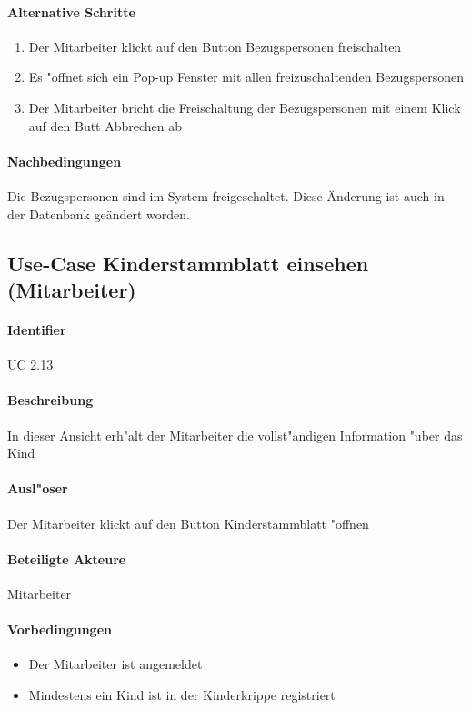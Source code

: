 		\paragraph{Alternative Schritte}
		\begin{enumerate}
			\item Der Mitarbeiter klickt auf den Button \dq Bezugspersonen freischalten\dq
			\item Es "offnet sich ein Pop-up Fenster mit allen freizuschaltenden Bezugspersonen
			\item Der Mitarbeiter bricht die Freischaltung der Bezugspersonen mit einem Klick auf den Butt \dq Abbrechen \dq ab
		\end{enumerate}
			
		\paragraph{Nachbedingungen}
		Die Bezugspersonen sind im System freigeschaltet. Diese Änderung ist auch in der Datenbank geändert worden. 
	  
    
  
  
  \newpage
 \subsection{Use-Case Kinderstammblatt einsehen (Mitarbeiter)}
  \paragraph{Identifier}
  UC 2.13
  \paragraph{Beschreibung}
  In dieser Ansicht erh"alt der Mitarbeiter die vollst"andigen Information "uber das Kind
  \paragraph{Ausl"oser}
  Der Mitarbeiter klickt auf den Button \dq Kinderstammblatt "offnen\dq
  \paragraph{Beteiligte Akteure}   \leavevmode \newline
    Mitarbeiter
  \paragraph{Vorbedingungen}
  \begin{itemize}
   \item Der Mitarbeiter ist angemeldet
   \item Mindestens ein Kind ist in der Kinderkrippe registriert
  \end{itemize}

